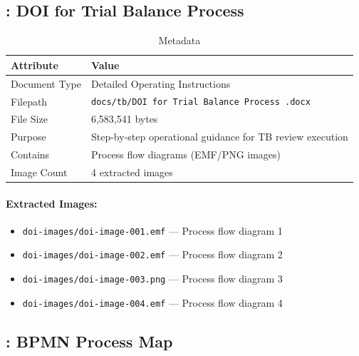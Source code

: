 \subsection{: DOI for Trial Balance Process}
\label{sec:tb-doi-001}

\begin{table}[h]
\centering
\caption{ Metadata}
\begin{tabularx}{\textwidth}{@{}L{4cm}L{10cm}@{}}
\toprule
\textbf{Attribute} & \textbf{Value} \\
\midrule
Document Type & Detailed Operating Instructions \\
Filepath & \texttt{docs/tb/DOI for Trial Balance Process .docx} \\
File Size & 6,583,541 bytes \\
Purpose & Step-by-step operational guidance for TB review execution \\
Contains & Process flow diagrams (EMF/PNG images) \\
Image Count & 4 extracted images \\
\bottomrule
\end{tabularx}
\end{table}

\paragraph{Extracted Images:}
\begin{itemize}[noitemsep]
  \item \texttt{doi-images/doi-image-001.emf} --- Process flow diagram 1
  \item \texttt{doi-images/doi-image-002.emf} --- Process flow diagram 2
  \item \texttt{doi-images/doi-image-003.png} --- Process flow diagram 3
  \item \texttt{doi-images/doi-image-004.emf} --- Process flow diagram 4
\end{itemize}

\subsection{: BPMN Process Map}
\label{sec:tb-bpmn-001}


